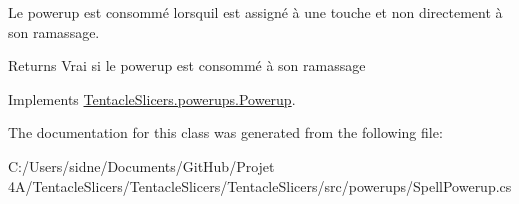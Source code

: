 Le powerup est consommé lorsqu\textquotesingle{}il est assigné à une touche et non directement à son ramassage. 

\begin{DoxyReturn}{Returns}
Vrai si le powerup est consommé à son ramassage 
\end{DoxyReturn}


Implements \hyperlink{class_tentacle_slicers_1_1powerups_1_1_powerup_a52c58d3898d05020220fc317b6f901d9}{Tentacle\+Slicers.\+powerups.\+Powerup}.



The documentation for this class was generated from the following file\+:\begin{DoxyCompactItemize}
\item 
C\+:/\+Users/sidne/\+Documents/\+Git\+Hub/\+Projet 4\+A/\+Tentacle\+Slicers/\+Tentacle\+Slicers/\+Tentacle\+Slicers/src/powerups/Spell\+Powerup.\+cs\end{DoxyCompactItemize}
